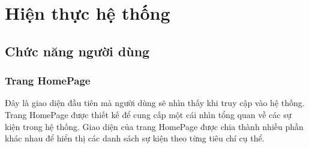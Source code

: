 \section{Hiện thực hệ thống}
\subsection{Chức năng người dùng}
\subsubsection{Trang HomePage}
\indent \indent Đây là giao diện đầu tiên mà người dùng sẽ nhìn thấy khi truy cập vào hệ thống. Trang HomePage được thiết kế để cung cấp một cái nhìn tổng quan về các sự kiện trong hệ thống.
Giao diện của trang HomePage được chia thành nhiều phần khác nhau để hiển thị các danh sách sự kiện theo từng tiêu chí cụ thể.\\

